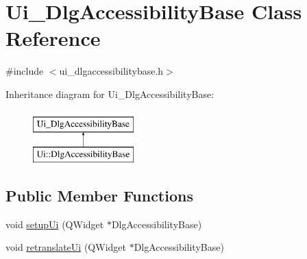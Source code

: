 \hypertarget{classUi__DlgAccessibilityBase}{\section{Ui\+\_\+\+Dlg\+Accessibility\+Base Class Reference}
\label{classUi__DlgAccessibilityBase}
}


{\ttfamily \#include $<$ui\+\_\+dlgaccessibilitybase.\+h$>$}

Inheritance diagram for Ui\+\_\+\+Dlg\+Accessibility\+Base\+:\begin{figure}[H]
\begin{center}
\leavevmode
\includegraphics[height=2.000000cm]{classUi__DlgAccessibilityBase}
\end{center}
\end{figure}
\subsection*{Public Member Functions}
\begin{DoxyCompactItemize}
\item 
void \hyperlink{classUi__DlgAccessibilityBase_a0c6d1f69279a2dcc2351f7d856ce61dd}{setup\+Ui} (Q\+Widget $\ast$Dlg\+Accessibility\+Base)
\item 
void \hyperlink{classUi__DlgAccessibilityBase_a4632d40dde4027283f0f10f641413f35}{retranslate\+Ui} (Q\+Widget $\ast$Dlg\+Accessibility\+Base)
\end{DoxyCompactItemize}
